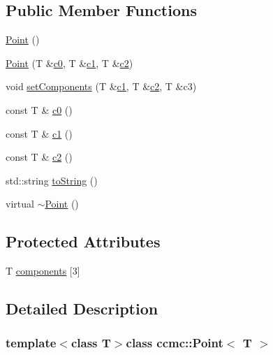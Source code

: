 \subsection*{Public Member Functions}
\begin{DoxyCompactItemize}
\item 
\hyperlink{classccmc_1_1_point_a8881795e7edf26ace773c7e524178911}{Point} ()
\item 
\hyperlink{classccmc_1_1_point_aa731cc619eba84648e393a810b127de7}{Point} (T \&\hyperlink{classccmc_1_1_point_a89fbc3792873bbc1b35d205fc0b56112}{c0}, T \&\hyperlink{classccmc_1_1_point_af305f62b5b3830dfb9659ba05fa8730b}{c1}, T \&\hyperlink{classccmc_1_1_point_aca8161451d99e44ad32f735265273db6}{c2})
\item 
void \hyperlink{classccmc_1_1_point_aa715484b0a52bffc43cd2d0e30bda80d}{set\-Components} (T \&\hyperlink{classccmc_1_1_point_af305f62b5b3830dfb9659ba05fa8730b}{c1}, T \&\hyperlink{classccmc_1_1_point_aca8161451d99e44ad32f735265273db6}{c2}, T \&c3)
\item 
const T \& \hyperlink{classccmc_1_1_point_a89fbc3792873bbc1b35d205fc0b56112}{c0} ()
\item 
const T \& \hyperlink{classccmc_1_1_point_af305f62b5b3830dfb9659ba05fa8730b}{c1} ()
\item 
const T \& \hyperlink{classccmc_1_1_point_aca8161451d99e44ad32f735265273db6}{c2} ()
\item 
std\-::string \hyperlink{classccmc_1_1_point_ac246652679eae76efc3746706122214a}{to\-String} ()
\item 
virtual \hyperlink{classccmc_1_1_point_ac9f16ef784a44eb8f58adfa3efd8d82a}{$\sim$\-Point} ()
\end{DoxyCompactItemize}
\subsection*{Protected Attributes}
\begin{DoxyCompactItemize}
\item 
T \hyperlink{classccmc_1_1_point_a2a4763777e84c356fa35f1fa19a7d429}{components} \mbox{[}3\mbox{]}
\end{DoxyCompactItemize}


\subsection{Detailed Description}
\subsubsection*{template$<$class T$>$class ccmc\-::\-Point$<$ T $>$}

